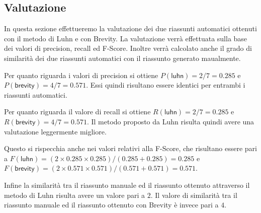 \subsection*{Valutazione}
In questa sezione effettueremo la valutazione dei due riassunti automatici ottenuti con il metodo di Luhn e con Brevity.
La valutazione verr\`{a} effettuata sulla base dei valori di precision, recall ed F-Score. Inoltre verr\`{a} calcolato anche il grado di similarit\`{a} dei due riassunti automatici con il riassunto generato maualmente.

Per quanto riguarda i valori di precision si ottiene $P(\textsf{luhn})= 2 / 7 = 0.285$ e $P(\textsf{brevity})= 4 / 7 = 0.571$. Essi quindi risultano essere
identici per entrambi i riassunti automatici.

Per quanto riguarda il valore di recall si ottiene $R(\textsf{luhn})= 2 / 7 = 0.285$ e $R(\textsf{brevity})= 4 / 7 = 0.571$. Il metodo proposto da Luhn risulta quindi avere una valutazione leggermente migliore.

Questo si rispecchia anche nei valori relativi alla F-Score, che risultano essere pari a $F(\textsf{luhn})= (2 \times 0.285 \times 0.285) / (0.285 + 0.285) = 0.285$ e
$F(\textsf{brevity})= (2 \times 0.571 \times 0.571) / (0.571 + 0.571) = 0.571$.

Infine la similarit\`{a} tra il riassunto manuale ed il riassunto ottenuto attraverso il metodo di Luhn risulta avere un valore pari a $2$.
Il valore di similarit\`{a} tra il riassunto manuale ed il riassunto ottenuto con Brevity \`{e} invece pari a $4$.
